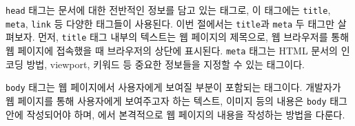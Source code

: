 \texttt{head} 태그는 문서에 대한 전반적인 정보를 담고 있는 태그로, 이 태그에는 \texttt{title}, \texttt{meta}, \texttt{link} 등 다양한 태그들이 사용된다. 이번 절에서는 \texttt{title}과 \texttt{meta} 두 태그만 살펴보자. 먼저, \texttt{title} 태그 내부의 텍스트는 웹 페이지의 제목으로, 웹 브라우저를 통해 웹 페이지에 접속했을 때 브라우저의 상단에 표시된다. \texttt{meta} 태그는 HTML 문서의 인코딩 방법, viewport, 키워드 등 중요한 정보들을 지정할 수 있는 태그이다. 

\texttt{body} 태그는 웹 페이지에서 사용자에게 보여질 부분이 포함되는 태그이다. 개발자가 웹 페이지를 통해 사용자에게 보여주고자 하는 텍스트, 이미지 등의 내용은 \texttt{body} 태그 안에 작성되어야 하며, 에서 본격적으로 웹 페이지의 내용을 작성하는 방법을 다룬다.
